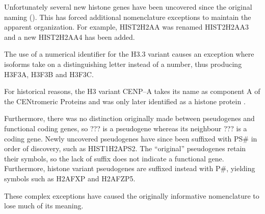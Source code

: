 	Unfortunately several new histone genes have been uncovered since the original naming (). 
	This has forced additional nomenclature exceptions to maintain the apparent organization.
	For example, HIST2H2AA was renamed HIST2H2AA3 and a new HIST2H2AA4 has been added.
	
	The use of a numerical identifier for the H3.3 variant causes an exception 
	where isoforms take on a distinguishing letter instead of a number, 
	thus producing H3F3A, H3F3B and H3F3C.
	
	For historical reasons, the H3 variant CENP--A takes its name as 
	component A of the CENtromeric Proteins \cite{CENPA-first-report} 
	and was only later identified as a histone protein \citep{CENPA-copurifies-histones, CENPA-sequence-analysis}.
	
	Furthermore, there was no distinction originally made between pseudogenes and functional coding genes, 
	so ??? is a pseudogene whereas its neighbour ??? is a coding gene.
	Newly uncovered pseudogenes have since been suffixed with PS\# in order of discovery, such as HIST1H2APS2. 
	The ``original'' pseudogenes retain their symbols, so the lack of suffix does not indicate a functional gene.
	Furthermore, histone variant pseudogenes are suffixed instead with P\#, yielding symbols such as H2AFXP and H2AFZP5.

    These complex exceptions have caused the originally informative nomenclature to lose much of its meaning. 



